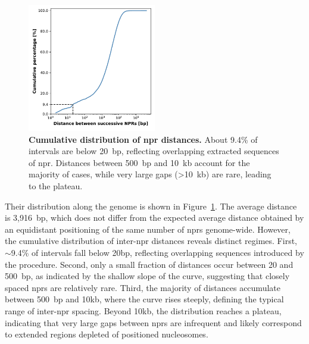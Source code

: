 \documentclass[11pt]{book}
\begin{document}
\begin{figure}[htbp]
    \centering
    \includegraphics[width=0.5\textwidth]{Figures/Results/cumulative_nprs_distance.pdf}
    \caption{\textbf{Cumulative distribution of \gls{npr} distances.} 
    About 9.4\% of intervals are below 20~bp, reflecting overlapping extracted sequences of \gls{npr}. Distances between 500~bp and 10~kb account for the majority of cases, while very large gaps (>10~kb) are rare, leading to the plateau.}
    \label{fig:nprs_distance}
\end{figure}

Their distribution along the genome is shown in Figure~\ref{fig:nprs_distance}. The average distance is 3,916~bp, which does not differ from the expected average distance obtained by an equidistant positioning of the same number of \glspl{npr} genome-wide. However, the cumulative distribution of inter-\gls{npr} distances reveals distinct regimes. 
First, $\sim$9.4\% of intervals fall below 20bp, reflecting overlapping sequences introduced by the procedure. Second, only a small fraction of distances occur between 20 and 500~bp, as indicated by the shallow slope of the curve, suggesting that closely spaced \glspl{npr} are relatively rare. Third, the majority of distances accumulate between 500~bp and 10kb, where the curve rises steeply, defining the typical range of inter-\gls{npr} spacing. 
Beyond 10kb, the distribution reaches a plateau, indicating that very large gaps between \glspl{npr} are infrequent and likely correspond to extended regions depleted of positioned nucleosomes.
\end{document}

